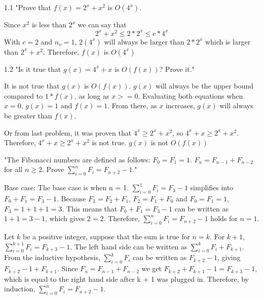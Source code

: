 \documentclass{article}
\author{Joshua Harthan}
\begin{document}
\item 1.1 "Prove that $f(x) = 2^x + x^2$ is $O(4^x)$. 
\item Since $x^2$ is less than $2^x$ we can say that $$2^x + x^2 \leq 2 * 2^x \leq c*4^x$$
With $c = 2$ and $n_o = 1$, $2(4^x)$ will always be larger than $2*2^x$ which is larger than $2^x + x^2$. Therefore, $f(x)$ is $O(4^x)$



\item 1.2 "Is it true that $g(x) = 4^x + x$ is $O(f(x))$? Prove it."

\item It is not true that $g(x)$ is $O(f(x))$. $g(x)$ will always be the upper bound compared to $1*f(x)$, as long as $x >= 0$. Evaluating both equations when $x = 0$, $g(x) = 1$ and $f(x) = 1$. From there, as $x$ increases, $g(x)$ will always be greater than $f(x)$. 

Or from last problem, it was proven that $4^x \geq 2^x + x^2$, so $4^x + x \geq 2^x + x^2$. Therefore, $4^x + x \geq 2^x + x^2$ is not true. $g(x)$ is not $O(f(x))$



\clearpage
\header

\item "The Fibonacci numbers are defined as follows: $F_0=F_1=1$. $F_n=F_{n-1} + F_{n-2}$ for all $n \geq 2$. Prove $\sum_{i=0}^n F_i = F_{n+2}-1$."

\item Base case: The base case is when n = 1. $\sum_{i=0}^1 F_i = F_3 - 1$ simplifies into $F_0 + F_1 = F_3 - 1$. Because $F_3=F_{2} + F_{1}$, $F_2 = F_1+ F_0$ and $F_0=F_1 = 1$, $F_3 = 1 + 1 + 1 = 3$. This means that $F_0 + F_1 = F_3 - 1$ can be written as $1 + 1 = 3 - 1$, which gives $2=2$. Therefore, $\sum_{i=0}^n F_i = F_{n+2}-1$ holds for $n = 1$.
\item Let $k$ be a positive integer, suppose that the sum is true for $n = k$. For $k + 1$, $\sum_{i=0}^{k+1} F_i = F_{k+3} - 1$. The left hand side can be written as $\sum_{i=0}^k F_i + F_{k+1}$. From the inductive hypothesis, $\sum_{i=0}^k F_i$ can be written as $F_{k+2}-1$, giving $F_{k+2} - 1 + F_{k+1}$. Since $F_n=F_{n-1} + F_{n-2}$ we get $F_{k+2} + F_{k+1} - 1 = F_{k+3} - 1$, which is equal to the right hand side after k + 1 was plugged in. Therefore, by induction, $\sum_{i=0}^n F_i = F_{n+2}-1$.

\clearpage
\header
\end{document}
